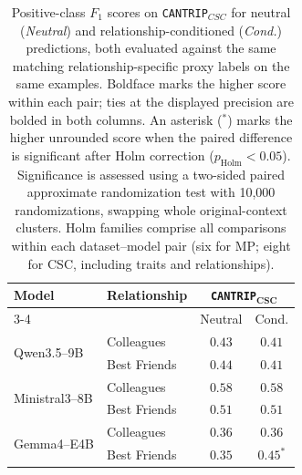 \begin{table}[t]
\centering
\small
\caption{
Positive-class $F_1$ scores on \texttt{CANTRIP}$_{CSC}$ for neutral (\emph{Neutral}) and relationship-conditioned (\emph{Cond.}) predictions, both evaluated against the same matching relationship-specific proxy labels on the same examples.
Boldface marks the higher score within each pair; ties at the displayed precision are bolded in both columns.
An asterisk ($^{*}$) marks the higher unrounded score when the paired difference is significant after Holm correction ($p_{\mathrm{Holm}} < 0.05$).
Significance is assessed using a two-sided paired approximate randomization test with 10,000 randomizations, swapping whole original-context clusters. Holm families comprise all comparisons within each dataset--model pair (six for MP; eight for CSC, including traits and relationships).
}
\setlength{\tabcolsep}{4pt}
\begin{tabular}{llcc}
\toprule
\textbf{Model} & \textbf{Relationship} &
\multicolumn{2}{c}{\textbf{\texttt{CANTRIP}$_{\mathbf{CSC}}$}} \\
\cmidrule(lr){3-4}
& & Neutral & Cond. \\
\midrule

\multirow{2}{*}{Qwen3.5--9B} & Colleagues & $\mathbf{0.43}$ & $0.41$ \\
 & Best Friends & $\mathbf{0.44}$ & $0.41$ \\

\midrule

\multirow{2}{*}{Ministral3--8B} & Colleagues & $\mathbf{0.58}$ & $\mathbf{0.58}$ \\
 & Best Friends & $\mathbf{0.51}$ & $\mathbf{0.51}$ \\

\midrule

\multirow{2}{*}{Gemma4--E4B} & Colleagues & $\mathbf{0.36}$ & $\mathbf{0.36}$ \\
 & Best Friends & $0.35$ & $\mathbf{0.45}^{*}$ \\

\bottomrule
\end{tabular}
\label{tab:experiment2_relationships_neutral_conditioned}
\end{table}
